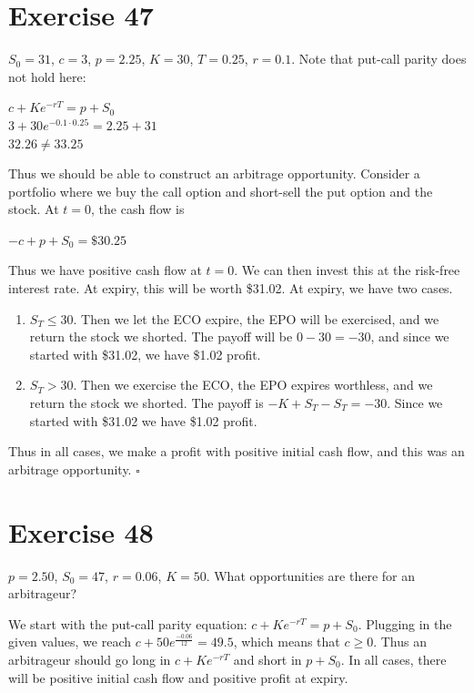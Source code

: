 \documentclass{article}
\begin{document}
\section*{Exercise 47}
\begin{flushleft}
    $S_0 = 31$, $c = 3$, $p = 2.25$, $K = 30$, $T = 0.25$, $r=0.1$.
    Note that put-call parity does not hold here:
    \begin{center}
        $c + Ke^{-rT} = p + S_0$ \\
        $3 + 30e^{-0.1 \cdot 0.25} = 2.25 + 31$ \\
        $32.26 \neq 33.25$
    \end{center}
    Thus we should be able to construct an arbitrage opportunity. Consider a portfolio where
    we buy the call option and short-sell the put option and the stock. At $t=0$, the cash flow is
    \begin{center}
        $-c + p + S_0 = \$30.25$
    \end{center}
    Thus we have positive cash flow at $t=0$. We can then invest this at the risk-free interest rate. At expiry, this will be worth \$31.02. At expiry, we have two cases.
    \begin{enumerate}
        \item $S_T \leq 30$. Then we let the ECO expire, the EPO will be exercised, and we return the stock we shorted. The payoff will be $0 - 30 = -30$,
                and since we started with \$31.02, we have \$1.02 profit.
        \item $S_T > 30$. Then we exercise the ECO, the EPO expires worthless, and we return the stock we shorted. The payoff is $-K + S_T - S_T = -30$.
                Since we started with \$31.02 we have \$1.02 profit.
    \end{enumerate}
    Thus in all cases, we make a profit with positive initial cash flow, and this was an arbitrage opportunity. $\square$
\end{flushleft}

\section*{Exercise 48}
$p = 2.50$, $S_0 = 47$, $r = 0.06$, $K=50$. What opportunities are there for an arbitrageur?
\begin{flushleft}
    We start with the put-call parity equation: $c + Ke^{-rT} = p + S_0$. Plugging in the given values, we reach $c + 50e^{\frac{-0.06}{12}} = 49.5$, which means that $c \geq 0$.
    Thus an arbitrageur should go long in $c + Ke^{-rT}$ and short in $p + S_0$. In all cases, there will be positive initial cash flow and positive profit at expiry.
\end{flushleft}
\end{document}
